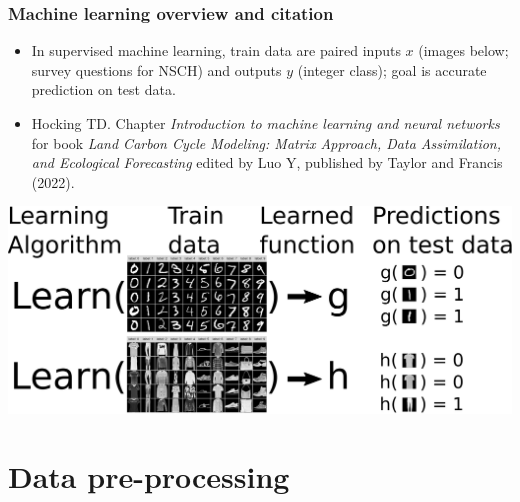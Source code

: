 \documentclass{beamer}
\begin{document}
\begin{frame}
  \frametitle{Machine learning overview and citation}
  \begin{itemize}
  \item In supervised machine learning, train data are paired inputs
    $x$ (images below; survey questions for NSCH) and outputs $y$
    (integer class); goal is accurate prediction on test data.
  \item Hocking TD. Chapter \emph{Introduction to machine learning and neural
    networks} for book \emph{Land Carbon Cycle Modeling: Matrix Approach,
    Data Assimilation, and Ecological Forecasting} edited by Luo Y,
    published by Taylor and Francis (2022).
  \end{itemize}

\includegraphics[width=\textwidth]{drawing-mnist-train-test}
\end{frame} 

\section{Data pre-processing}
\end{document}
